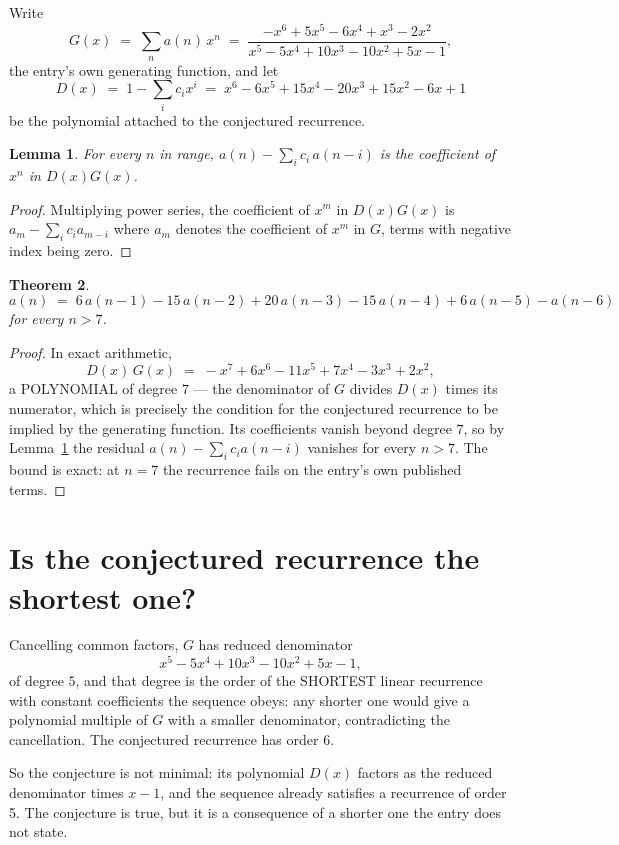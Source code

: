 \documentclass[11pt,a4paper]{article}
\theoremstyle{plain}
\newtheorem{theorem}{Theorem}
\newtheorem{lemma}[theorem]{Lemma}
\theoremstyle{definition}
\begin{document}
Write
\[
G(x)\;=\;\sum_{n}a(n)\,x^{n}\;=\;\frac{- x^{6} + 5 x^{5} - 6 x^{4} + x^{3} - 2 x^{2}}{x^{5} - 5 x^{4} + 10 x^{3} - 10 x^{2} + 5 x - 1},
\]
the entry's own generating function, and let
\[
D(x)\;=\;1-\sum_i c_i x^{i}\;=\;x^{6} - 6 x^{5} + 15 x^{4} - 20 x^{3} + 15 x^{2} - 6 x + 1
\]
be the polynomial attached to the conjectured recurrence.

\begin{lemma}\label{lem:key}
For every $n$ in range, $a(n)-\sum_i c_i\,a(n-i)$ is the coefficient of $x^{n}$ in
$D(x)G(x)$.
\end{lemma}

\begin{proof}
Multiplying power series, the coefficient of $x^{m}$ in $D(x)G(x)$ is
$a_m-\sum_i c_i a_{m-i}$ where $a_m$ denotes the coefficient of $x^{m}$ in $G$, terms with
negative index being zero.
\end{proof}

\begin{theorem}
\[
a(n)\;=\;6\,a(n-1) - 15\,a(n-2) + 20\,a(n-3) - 15\,a(n-4) + 6\,a(n-5) - a(n-6)
\]
for every $n>7$.
\end{theorem}

\begin{proof}
In exact arithmetic,
\[
D(x)\,G(x)\;=\;- x^{7} + 6 x^{6} - 11 x^{5} + 7 x^{4} - 3 x^{3} + 2 x^{2},
\]
a POLYNOMIAL of degree $7$ --- the denominator of $G$ divides $D(x)$ times its numerator,
which is precisely the condition for the conjectured recurrence to be implied by the
generating function. Its coefficients vanish beyond degree $7$, so by
Lemma~\ref{lem:key} the residual $a(n)-\sum_ic_ia(n-i)$ vanishes for every
$n>7$. The bound is exact: at $n=7$ the recurrence fails on the entry's own published terms.
\end{proof}

\section{Is the conjectured recurrence the shortest one?}

Cancelling common factors, $G$ has reduced denominator
\[
x^{5} - 5 x^{4} + 10 x^{3} - 10 x^{2} + 5 x - 1,
\]
of degree $5$, and that degree is the order of the SHORTEST linear recurrence with
constant coefficients the sequence obeys: any shorter one would give a polynomial multiple of
$G$ with a smaller denominator, contradicting the cancellation. The conjectured recurrence has
order $6$.

So the conjecture is not minimal: its polynomial $D(x)$ factors as the reduced denominator times $x - 1$, and the sequence already satisfies a recurrence of order 5. The conjecture is true, but it is a consequence of a shorter one the entry does not state.
\end{document}

